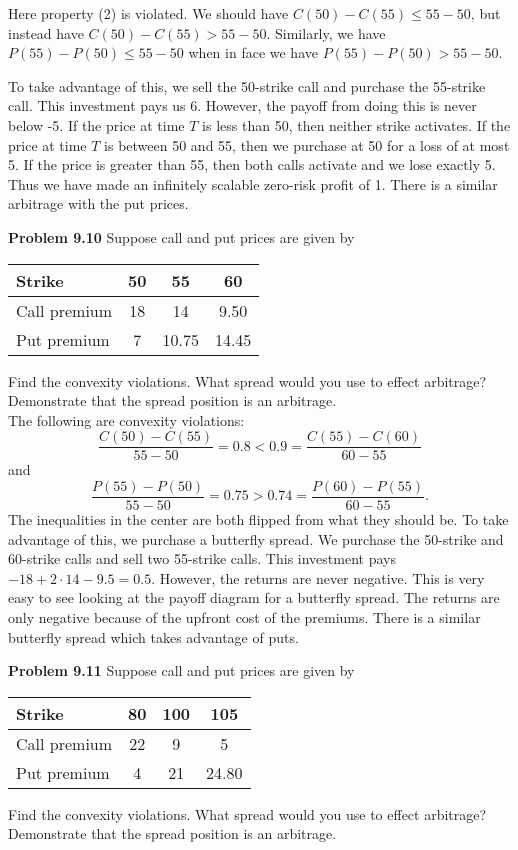 \documentclass[12pt]{article}
\newcommand{\problem}[1]{\bigskip \noindent \textbf{Problem #1}}
\theoremstyle{plain}
\begin{document}
Here property (2) is violated. We should have $C(50)-C(55) \leq 55-50$, but instead have $C(50)-C(55) > 55-50$. Similarly, we have $P(55)-P(50) \leq 55-50$ when in face we have $P(55) - P(50) > 55-50$.

To take advantage of this, we sell the 50-strike call and purchase the 55-strike call. This investment pays us 6. However, the payoff from doing this is never below -5. If the price at time $T$ is less than 50, then neither strike activates. If the price at time $T$ is between 50 and 55, then we purchase at 50 for a loss of at most 5. If the price is greater than 55, then both calls activate and we lose exactly 5. Thus we have made an infinitely scalable zero-risk profit of 1. There is a similar arbitrage with the put prices.

\problem{9.10} Suppose call and put prices are given by 
\begin{center}
\begin{tabular}{l||ccc}
Strike & 50 & 55 & 60\\ \hline \hline
Call premium & 18 & 14 & 9.50\\
Put premium & 7 & 10.75 & 14.45
\end{tabular}
\end{center}
Find the convexity violations. What spread would you use to effect arbitrage? Demonstrate that the spread position is an arbitrage.\\

The following are convexity violations:
\[
\frac{C(50) - C(55)}{55 - 50} = 0.8 < 0.9 = \frac{C(55) - C(60)}{60 - 55}
\]
and
\[
\frac{P(55) - P(50)}{55- 50} = 0.75 > 0.74 = \frac{P(60) - P(55)}{60 - 55}.
\]
The inequalities in the center are both flipped from what they should be. To take advantage of this, we purchase a butterfly spread. We purchase the 50-strike and 60-strike calls and sell two 55-strike calls. This investment pays $-18 + 2\cdot14 - 9.5 = 0.5$. However, the returns are never negative. This is very easy to see looking at the payoff diagram for a butterfly spread. The returns are only negative because of the upfront cost of the premiums. There is a similar butterfly spread which takes advantage of puts.

\problem{9.11} Suppose call and put prices are given by
\begin{center}
\begin{tabular}{l||ccc}
Strike & 80 & 100 & 105\\ \hline \hline
Call premium & 22 & 9 & 5\\
Put premium & 4 & 21 & 24.80
\end{tabular}
\end{center}
Find the convexity violations. What spread would you use to effect arbitrage? Demonstrate that the spread position is an arbitrage.\\
\end{document}
